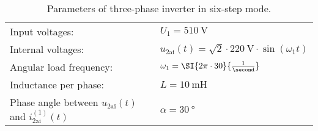 \begin{table}[ht]
    \centering  %
    \begin{tabular}{ll}
        \toprule
        Input voltages: & $U_\mathrm{1}=\SI{510}{\volt}$ \\
        Internal voltages: & $u_{\mathrm{2ai}}(t) = \sqrt{2} \cdot \SI{220}{\volt} \cdot \sin(\omega_1t)$ \\
        Angular load frequency: & $\omega_1 = \SI{2 \pi \cdot 30}{\frac{1}{\second}}$ \\ 
        Inductance per phase: & $L= \SI{10}{\milli \henry}$ \\
        Phase angle between  $u_{\mathrm{2ai}}(t)$ and $i_{\mathrm{2ai}}^\mathrm{(1)}(t)$ & $\alpha=\SI{30}{\degree}$ \\
        \bottomrule
    \end{tabular}
    \caption{Parameters of three-phase inverter in six-step mode.}  
    \label{table:ex07_Task2_ParametersOfTheCircuit}
\end{table}

